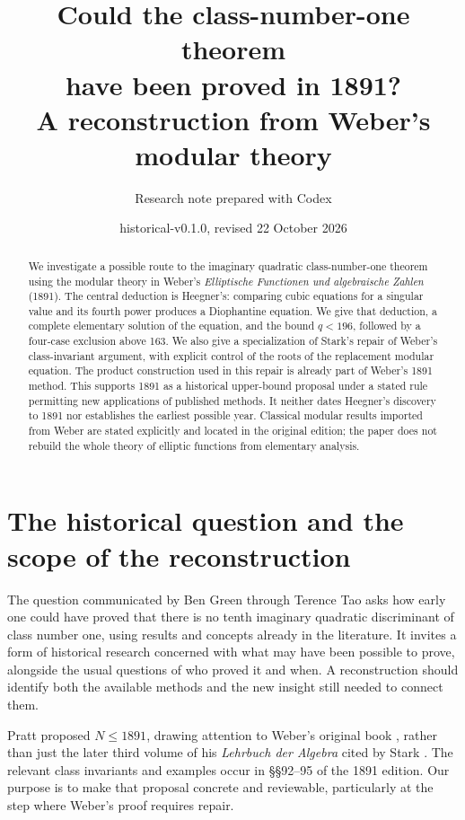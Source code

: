 \documentclass[11pt]{article}
\title{Could the class-number-one theorem\\have been proved in 1891?\\
\large A reconstruction from Weber's modular theory}
\author{Research note prepared with Codex}
\date{historical-v0.1.0, revised 22 October 2026}
\begin{document}
\maketitle

\begin{abstract}
We investigate a possible route to the imaginary quadratic
class-number-one theorem using the modular theory in Weber's
\emph{Elliptische Functionen und algebraische Zahlen} (1891).
The central deduction is Heegner's: comparing cubic equations for a
singular value and its fourth power produces a Diophantine equation.
We give that deduction, a complete elementary solution of the equation,
and the bound \(q<196\), followed by a four-case exclusion above 163.
We also give a specialization of Stark's repair of Weber's
class-invariant argument, with explicit control of the roots of the
replacement modular equation. The product construction used in this
repair is already part of Weber's 1891 method. This supports 1891 as a
historical upper-bound proposal under a stated rule permitting new
applications of published methods. It neither dates Heegner's discovery
to 1891 nor establishes the earliest possible year. Classical modular
results imported from Weber are stated explicitly and located in the
original edition; the paper does not rebuild the whole theory of
elliptic functions from elementary analysis.
\end{abstract}

\section{The historical question and the scope of the reconstruction}

The question communicated by Ben Green through Terence Tao
\cite{tao} asks how early one could have proved that there is no tenth
imaginary quadratic discriminant of class number one, using results and
concepts already in the literature. It invites a form of historical
research concerned with what may have been possible to prove, alongside
the usual questions of who proved it and when. A reconstruction should
identify both the available methods and the new insight still needed to
connect them.

Pratt \cite{pratt} proposed \(N\le1891\), drawing attention to
Weber's original book \cite{weber}, rather than just the later third
volume of his \emph{Lehrbuch der Algebra} cited by Stark
\cite{stark}. The relevant class invariants and examples occur in
\S\S92--95 of the 1891 edition. Our purpose is to make that proposal
concrete and reviewable, particularly at the step where Weber's proof
requires repair.
\end{document}
